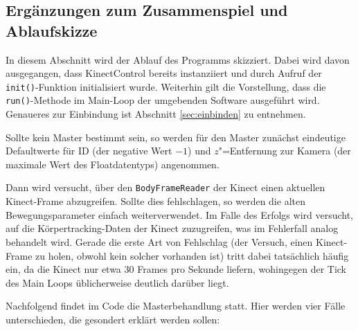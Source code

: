 \subsection{Ergänzungen zum Zusammenspiel und Ablaufskizze}
In diesem Abschnitt wird der Ablauf des Programms skizziert. Dabei wird davon ausgegangen, dass KinectControl bereits instanziiert und durch Aufruf der \texttt{init()}-Funktion initialisiert wurde. Weiterhin gilt die Vorstellung, dass die \texttt{run()}-Methode im Main-Loop der umgebenden Software ausgeführt wird. Genaueres zur Einbindung ist Abschnitt \ref{sec:einbinden} zu entnehmen.\par 
Sollte kein Master bestimmt sein, so werden für den Master zunächst eindeutige Defaultwerte für ID (der negative Wert $-1$) und $z$"=Entfernung zur Kamera (der maximale Wert des Floatdatentyps) angenommen.\par 
Dann wird versucht, über den \texttt{BodyFrameReader} der Kinect einen aktuellen Kinect-Frame abzugreifen. Sollte dies fehlschlagen, so werden die alten Bewegungsparameter einfach weiterverwendet. Im Falle des Erfolgs wird versucht, auf die Körpertracking-Daten der Kinect zuzugreifen, was im Fehlerfall analog behandelt wird. Gerade die erste Art von Fehlschlag (der Versuch, einen Kinect-Frame zu holen, obwohl kein solcher vorhanden ist) tritt dabei tatsächlich häufig ein, da die Kinect nur etwa 30 Frames pro Sekunde liefern, wohingegen der Tick des Main Loops üblicherweise deutlich darüber liegt.\par 
Nachfolgend findet im Code die Masterbehandlung statt. Hier werden vier Fälle unterschieden, die gesondert erklärt werden sollen:

